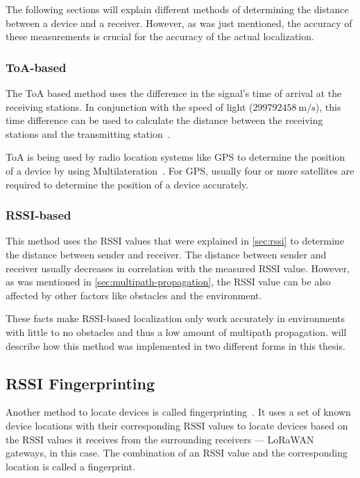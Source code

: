 The following sections will explain different methods of determining the distance between a device and a receiver.
However, as was just mentioned, the accuracy of these measurements is crucial for the accuracy of the actual localization.

\subsubsection{\acs{ToA}-based}\label{sec:toa-based-multilateration}

The \acf{ToA} based method uses the difference in the signal's time of arrival at the receiving stations.
In conjunction with the speed of light ($299792458\ \mathrm{m/s}$), this time difference can be used to calculate the distance between the receiving stations and the transmitting station~\cite{khalaf-allah_time_2015}.

\ac{ToA} is being used by radio location systems like \ac{GPS} to determine the position of a device by using Multilateration~\cite{department_of_defense_usa_gps_2020}.
For GPS, usually four or more satellites are required to determine the position of a device accurately.

\subsubsection{\acs{RSSI}-based}\label{sec:rssi-based-multilateration}

This method uses the \acf{RSSI} values that were explained in \cref{sec:rssi} to determine the distance between sender and receiver.
The distance between sender and receiver usually decreases in correlation with the measured \ac{RSSI} value.
However, as was mentioned in \cref{sec:multipath-propagation}, the \ac{RSSI} value can be also affected by other factors like obstacles and the environment.

These facts make \ac{RSSI}-based localization only work accurately in environments with little to no obstacles and thus a low amount of multipath propagation.
 will describe how this method was implemented in two different forms in this thesis.

\subsection{\acs{RSSI} Fingerprinting}\label{sec:rssi-fingerprinting}

Another method to locate devices is called fingerprinting~\cite{xia_indoor_2017}.
It uses a set of known device locations with their corresponding \ac{RSSI} values to locate devices based on the \ac{RSSI} values it receives from the surrounding receivers --- \ac{LoRaWAN} gateways, in this case.
The combination of an \ac{RSSI} value and the corresponding location is called a fingerprint.

